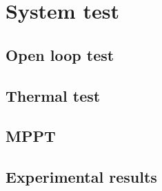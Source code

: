 \section{System test}

\subsection{Open loop test}

\subsection{Thermal test}

\subsection{MPPT}

\subsection{Experimental results}